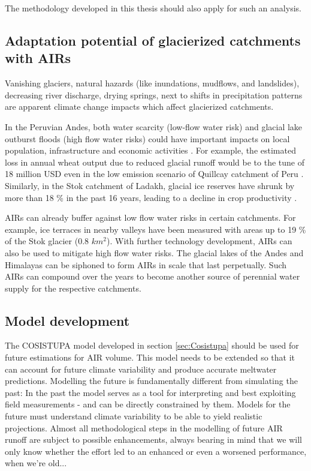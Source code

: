 The methodology developed in this thesis should also apply for such an analysis.


\subsection{Adaptation potential of glacierized catchments with AIRs}

Vanishing glaciers, natural hazards (like inundations, mudflows, and landslides), decreasing river discharge,
drying springs, next to shifts in precipitation patterns are apparent climate change impacts which affect
glacierized catchments.

In the Peruvian Andes, both water scarcity (low-flow water risk) and glacial lake outburst floods (high flow
water risks) could have important impacts on local population, infrastructure and economic activities
\citep{motschmannIntegratedAssessmentsWater2020}. For example, the estimated loss in annual wheat output due to
reduced glacial runoff would be to the tune of 18 million USD even in the low emission scenario of Quillcay catchment
of Peru \citep{motschmannLossesDamagesConnected2020}. Similarly, in the Stok catchment of Ladakh, glacial ice
reserves have shrunk by more than 18 \% in the past 16 years, leading to a decline in crop productivity
\citep{sohebSpatiotemporalQuantificationKey2022}.

AIRs can already buffer against low flow water risks in certain catchments. For example, ice
terraces in nearby valleys have been measured with areas up to 19 \% of the Stok glacier (0.8 $km^2$). With further technology
development, AIRs can also be used to mitigate high flow water risks. The glacial lakes of the Andes and
Himalayas can be siphoned to form AIRs in scale that last perpetually. Such AIRs can compound over the years to
become another source of perennial water supply for the respective catchments.


\subsection{Model development}

The COSISTUPA model developed in section \ref{sec:Cosistupa} should be used for future estimations for AIR
volume. This model needs to be extended so that it can account for future climate variability and produce
accurate meltwater predictions. Modelling the future is fundamentally different from simulating the past: In the
past the model serves as a tool for interpreting and best exploiting field measurements - and can be directly
constrained by them. Models for the future must understand climate variability to be able to yield realistic
projections. Almost all methodological steps in the modelling of future AIR runoff are subject to possible
enhancements, always bearing in mind that we will only know whether the effort led to an enhanced or even a
worsened performance, when we're old...

